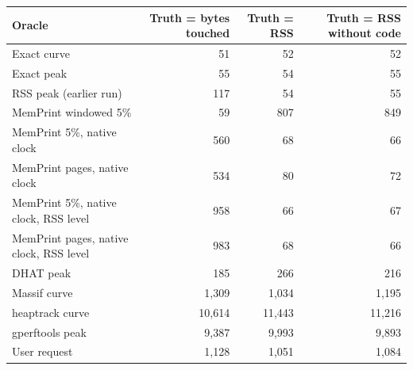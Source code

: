 \begin{tabular}{lrrr}
\toprule
Oracle & Truth = bytes touched & Truth = RSS & Truth = RSS without code \\
\midrule
Exact curve & 51 & 52 & 52 \\
Exact peak & 55 & 54 & 55 \\
RSS peak (earlier run) & 117 & 54 & 55 \\
MemPrint windowed 5\% & 59 & 807 & 849 \\
MemPrint 5\%, native clock & 560 & 68 & 66 \\
MemPrint pages, native clock & 534 & 80 & 72 \\
MemPrint 5\%, native clock, RSS level & 958 & 66 & 67 \\
MemPrint pages, native clock, RSS level & 983 & 68 & 66 \\
DHAT peak & 185 & 266 & 216 \\
Massif curve & 1{,}309 & 1{,}034 & 1{,}195 \\
heaptrack curve & 10{,}614 & 11{,}443 & 11{,}216 \\
gperftools peak & 9{,}387 & 9{,}993 & 9{,}893 \\
User request & 1{,}128 & 1{,}051 & 1{,}084 \\
\bottomrule
\end{tabular}
